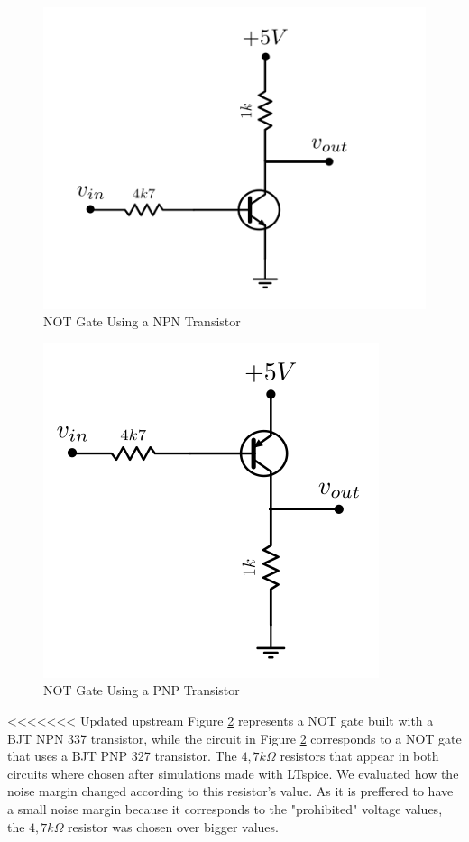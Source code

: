 \begin{figure}[h!]
\centering
\includegraphics[scale=1]{../Exercise1/circuitoNPN}
\caption{NOT Gate Using a NPN Transistor}
\label{circNPN}
\end{figure}

\begin{figure}[h!]
\centering
\includegraphics[scale=1]{../Exercise1/circuitoPNP}
\caption{NOT Gate Using a PNP Transistor}
\label{circPNP}
\end{figure}

<<<<<<< Updated upstream
Figure \ref{circPNP} represents a NOT gate built with a BJT NPN 337 transistor, while the circuit in Figure \ref{circPNP} corresponds to a NOT gate that uses a BJT PNP 327 transistor. The $4,7k{\Omega}$ resistors that appear in both circuits where chosen after simulations made with LTspice. We evaluated how the noise margin changed according to this resistor's value. As it is preffered to have a small noise margin because it corresponds to the "prohibited" voltage values, the $4,7k{\Omega}$ resistor was chosen over bigger values.



